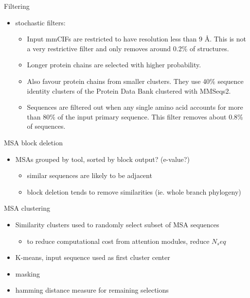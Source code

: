\documentclass[presentation, smaller]{beamer}
\begin{document}
\begin{frame}[label={sec:org75da01b}]{Filtering \cite{jumperHighlyAccurateProtein2021}}
\begin{itemize}
\item stochastic filters: 
\begin{itemize}
\item Input mmCIFs are restricted to have resolution less than 9 Å. This is not a very restrictive filter and only removes around 0.2\% of structures.
\item Longer protein chains are selected with higher probability.
\item Also favour protein chains from smaller clusters. They use 40\% sequence identity clusters of the Protein Data Bank clustered with MMSeqs2.
\item Sequences are filtered out when any single amino acid accounts for more than 80\% of the input primary sequence. This filter removes about 0.8\% of sequences.
\end{itemize}
\end{itemize}
\end{frame}

\begin{frame}[label={sec:org04257b4}]{MSA block deletion \cite{jumperHighlyAccurateProtein2021}}
\begin{itemize}
\item MSAs grouped by tool, sorted by block output? (e-value?)
\begin{itemize}
\item similar sequences are likely to be adjacent
\item block deletion tends to remove similarities (ie. whole branch phylogeny)
\end{itemize}
\end{itemize}
\end{frame}

\begin{frame}[label={sec:orgdf8c8ab}]{MSA clustering \cite{jumperHighlyAccurateProtein2021}}
\begin{itemize}
\item Similarity clusters used to randomly select subset of MSA sequences 
\begin{itemize}
\item to reduce computational cost from attention modules, reduce \(N_seq\)
\end{itemize}

\item K-means, input sequence used as first cluster center
\item masking
\item hamming distance measure for remaining selections
\end{itemize}
\end{frame}
\end{document}
